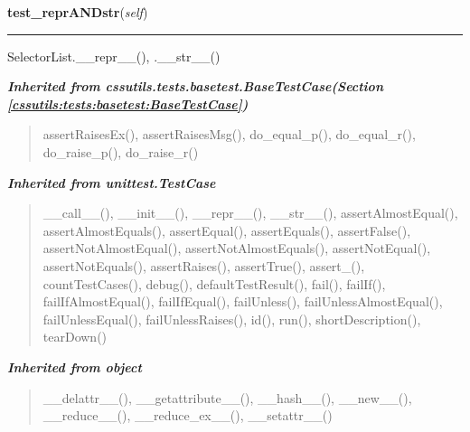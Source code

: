     \label{cssutils:tests:test_selectorlist:SelectorListTestCase:test_reprANDstr}

    \vspace{0.5ex}

\hspace{.8\funcindent}\begin{boxedminipage}{\funcwidth}

    \raggedright \textbf{test\_reprANDstr}(\textit{self})

    \vspace{-1.5ex}

    \rule{\textwidth}{0.5\fboxrule}
\setlength{\parskip}{2ex}
    SelectorList.\_\_repr\_\_(), .\_\_str\_\_()

\setlength{\parskip}{1ex}
    \end{boxedminipage}


\large{\textbf{\textit{Inherited from cssutils.tests.basetest.BaseTestCase\textit{(Section \ref{cssutils:tests:basetest:BaseTestCase})}}}}

\begin{quote}
assertRaisesEx(), assertRaisesMsg(), do\_equal\_p(), do\_equal\_r(), do\_raise\_p(), do\_raise\_r()
\end{quote}

\large{\textbf{\textit{Inherited from unittest.TestCase}}}

\begin{quote}
\_\_call\_\_(), \_\_init\_\_(), \_\_repr\_\_(), \_\_str\_\_(), assertAlmostEqual(), assertAlmostEquals(), assertEqual(), assertEquals(), assertFalse(), assertNotAlmostEqual(), assertNotAlmostEquals(), assertNotEqual(), assertNotEquals(), assertRaises(), assertTrue(), assert\_(), countTestCases(), debug(), defaultTestResult(), fail(), failIf(), failIfAlmostEqual(), failIfEqual(), failUnless(), failUnlessAlmostEqual(), failUnlessEqual(), failUnlessRaises(), id(), run(), shortDescription(), tearDown()
\end{quote}

\large{\textbf{\textit{Inherited from object}}}

\begin{quote}
\_\_delattr\_\_(), \_\_getattribute\_\_(), \_\_hash\_\_(), \_\_new\_\_(), \_\_reduce\_\_(), \_\_reduce\_ex\_\_(), \_\_setattr\_\_()
\end{quote}

